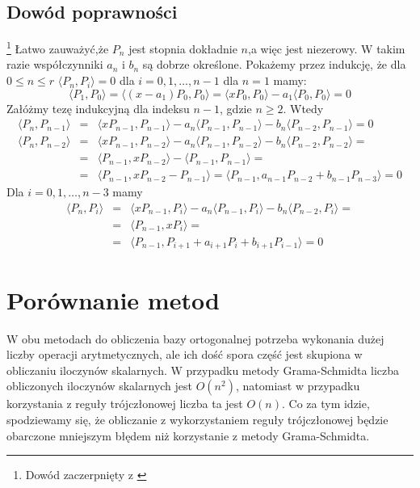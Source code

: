 \documentclass[12pt,wide]{mwart}
\begin{document}
\subsection{Dowód poprawności}\footnote{Dowód zaczerpnięty z \cite[strona 365]{Kin}} 
Łatwo zauważyć,że $P_n$ jest stopnia dokładnie $n$,a więc jest niezerowy. W takim razie współczynniki $a_n$ i $b_n$ są dobrze określone. Pokażemy przez indukcję, że dla $0 \leq n \leq r$ $\langle P_n,P_i \rangle = 0$ dla $i = 0,1,\ldots,n-1$ dla $n=1$ mamy:
$$
 \langle P_1,P_0 \rangle = \langle (x-a_1)P_0,P_0 \rangle = \langle xP_0,P_0 \rangle - a_1\langle P_0,P_0 \rangle = 0 
$$
Załóżmy tezę indukcyjną dla indeksu $n-1$, gdzie $n \geq 2$. Wtedy
\begin{eqnarray*}
\langle P_n,P_{n-1} \rangle &=& \langle xP_{n-1},P_{n-1} \rangle - a_n\langle P_{n-1},P_{n-1} \rangle - b_n\langle P_{n-2},P_{n-1} \rangle = 0\\
\langle P_n,P_{n-2} \rangle &=& \langle xP_{n-1},P_{n-2} \rangle - a_n\langle P_{n-1},P_{n-2} \rangle - b_n\langle P_{n-2},P_{n-2} \rangle=\\&=& \langle P_{n-1},xP_{n-2} \rangle - \langle P_{n-1},P_{n-1} \rangle= \\
&=& \langle P_{n-1},xP_{n-2} - P_{n-1} \rangle = \langle P_{n-1},a_{n-1}P_{n-2} + b_{n-1}P_{n-3} \rangle = 0
\end{eqnarray*}
Dla $i = 0,1,\ldots,n-3$ mamy
\begin{eqnarray*}
\langle P_n,P_i \rangle &=& \langle xP_{n-1},P_i \rangle - a_n\langle P_{n-1},P_i \rangle - b_n\langle P_{n-2},P_i \rangle =\\ &=& \langle P_{n-1},xP_i \rangle = \\ &=& \langle P_{n-1},P_{i+1} + a_{i+1}P_i + b_{i+1}P_{i-1} \rangle = 0 
\end{eqnarray*}


\section{Porównanie metod}
W obu metodach do obliczenia bazy ortogonalnej potrzeba wykonania dużej liczby operacji arytmetycznych, ale ich dość spora część jest skupiona w obliczaniu iloczynów skalarnych. W przypadku metody Grama-Schmidta liczba obliczonych iloczynów skalarnych jest $O(n^2)$, natomiast w przypadku korzystania z reguły trójczłonowej liczba ta jest $O(n)$. Co za tym idzie, spodziewamy się, że obliczanie z wykorzystaniem reguły trójczłonowej będzie obarczone mniejszym błędem niż korzystanie z metody Grama-Schmidta.\\
\end{document}
